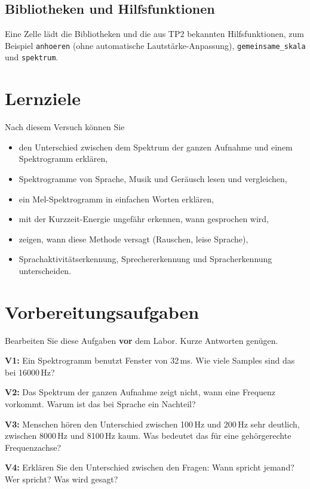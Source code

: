 \documentclass[11pt]{article}
\begin{document}
\subsection{Bibliotheken und Hilfsfunktionen}

Eine Zelle lädt die Bibliotheken und die aus TP2 bekannten Hilfsfunktionen, zum Beispiel \texttt{anhoeren} (ohne automatische Lautstärke-Anpassung), \texttt{gemeinsame\_skala} und \texttt{spektrum}.

\section{Lernziele}

Nach diesem Versuch können Sie
\begin{itemize}
  \item den Unterschied zwischen dem Spektrum der ganzen Aufnahme und einem Spektrogramm erklären,
  \item Spektrogramme von Sprache, Musik und Geräusch lesen und vergleichen,
  \item ein Mel-Spektrogramm in einfachen Worten erklären,
  \item mit der Kurzzeit-Energie ungefähr erkennen, wann gesprochen wird,
  \item zeigen, wann diese Methode versagt (Rauschen, leise Sprache),
  \item Sprachaktivitätserkennung, Sprechererkennung und Spracherkennung unterscheiden.
\end{itemize}

\bigskip
\section{Vorbereitungsaufgaben}

Bearbeiten Sie diese Aufgaben \textbf{vor} dem Labor. Kurze Antworten genügen.

\begin{block}
\textbf{V1:} Ein Spektrogramm benutzt Fenster von 32\,ms. Wie viele Samples sind das bei 16000\,Hz?
\end{block}
\begin{block}
\textbf{V2:} Das Spektrum der ganzen Aufnahme zeigt nicht, wann eine Frequenz vorkommt. Warum ist das bei Sprache ein Nachteil?
\end{block}
\begin{block}
\textbf{V3:} Menschen hören den Unterschied zwischen 100\,Hz und 200\,Hz sehr deutlich, zwischen 8000\,Hz und 8100\,Hz kaum. Was bedeutet das für eine gehörgerechte Frequenzachse?
\end{block}
\begin{block}
\textbf{V4:} Erklären Sie den Unterschied zwischen den Fragen: Wann spricht jemand? Wer spricht? Was wird gesagt?
\end{block}
\end{document}

